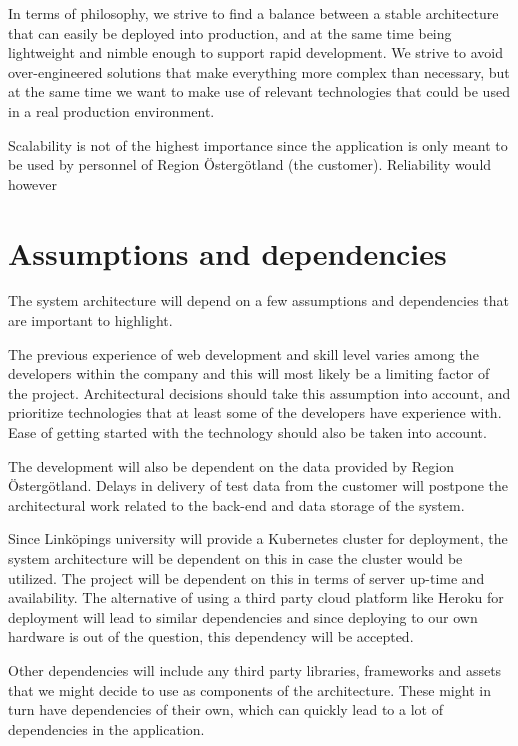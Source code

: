 \documentclass{article}
\begin{document}
In terms of philosophy, we strive to find a balance between a stable architecture that can easily be deployed into production, and at the same time being lightweight and nimble enough to support rapid development. We strive to avoid over-engineered solutions that make everything more complex than necessary, but at the same time we want to make use of relevant technologies that could be used in a real production environment.

Scalability is not of the highest importance since the application is only meant to be used by personnel of Region Östergötland (the customer). Reliability would however

\section{Assumptions and dependencies}
The system architecture will depend on a few assumptions and dependencies that are important to highlight. 

The previous experience of web development and skill level varies among the developers within the company and this will most likely be a limiting factor of the project. Architectural decisions should take this assumption into account, and prioritize technologies that at least some of the developers have experience with. Ease of getting started with the technology should also be taken into account.

The development will also be dependent on the data provided by Region Östergötland. Delays in delivery of test data from the customer will postpone the architectural work related to the back-end and data storage of the system.

Since Linköpings university will provide a Kubernetes cluster for deployment, the system architecture will be dependent on this in case the cluster would be utilized. The project will be dependent on this in terms of server up-time and availability. The alternative of using a third party cloud platform like Heroku for deployment will lead to similar dependencies and since deploying to our own hardware is out of the question, this dependency will be accepted. 

Other dependencies will include any third party libraries, frameworks and assets that we might decide to use as components of the architecture. These might in turn have dependencies of their own, which can quickly lead to a lot of dependencies in the application. 
\end{document}

